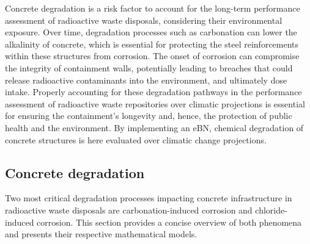 
Concrete degradation is a risk factor to account for the long-term performance assessment of radioactive waste disposals, considering their environmental exposure. Over time, degradation processes such as carbonation can lower the alkalinity of concrete, which is essential for protecting the steel reinforcements within these structures from corrosion.
The onset of corrosion can compromise the integrity of containment walls, potentially leading to breaches that could release radioactive contaminants into the environment, and ultimately dose intake.
Properly accounting for these degradation pathways in the performance assessment of radioactive waste repositories over climatic projections is essential for ensuring the containment's longevity and, hence, the protection of public health and the environment. By implementing an eBN, chemical degradation of concrete structures is here evaluated over climatic change projections. 

\subsection{Concrete degradation}
Two most critical degradation processes impacting concrete infrastructure in radioactive waste disposals are carbonation-induced corrosion and chloride-induced corrosion. This section provides a concise overview of both phenomena and presents their respective mathematical models.

